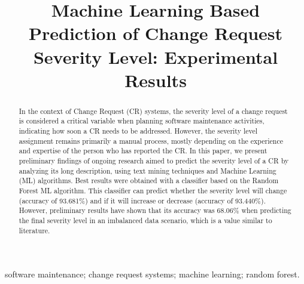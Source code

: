 \documentclass[10pt, conference]{IEEEtran}
\begin{document}
\title{Machine Learning Based Prediction of Change Request Severity Level: Experimental Results}

\author{
\and
{}
}

\maketitle

\begin{abstract}
In the context of Change Request (CR) systems, the severity level of a change request is considered a critical variable when planning software maintenance activities, indicating how soon a CR needs to be addressed. However, the severity level assignment remains primarily a manual process, mostly depending on the experience and expertise of the person who has reported the CR. In this paper, we present preliminary findings of ongoing research aimed to predict the severity level of a CR by analyzing its long description, using text mining techniques and Machine Learning (ML) algorithms. Best results were obtained with a classifier based on the Random Forest ML algorithm. This classifier can predict whether the severity level will change (accuracy of 93.681\%) and if it will increase or decrease (accuracy of 93.440\%). However, preliminary results have shown that its accuracy was 68.06\% when predicting the final severity level in an imbalanced data scenario, which is a value similar to literature.

\end{abstract}

\begin{IEEEkeywords}
software maintenance; change request systems; machine learning; random forest.
\end{IEEEkeywords}


%
\IEEEpeerreviewmaketitle
\end{document}
